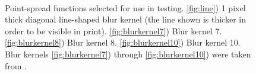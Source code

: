 \documentclass[12pt,notitlepage]{report}
\begin{document}
\begin{figure}[htb]
  \centering
	  ~
	  ~
	  ~
  \caption[Point-spread functions selected for use in testing]{Point-spread functions selected for use in testing. \ref{fig:line}) 1 pixel thick diagonal line-shaped blur kernel (the line shown is thicker in order to be visible in print). \ref{fig:blurkernel7}) Blur kernel 7. \ref{fig:blurkernel8}) Blur kernel 8. \ref{fig:blurkernel10}) Blur kernel 10. Blur kernels \ref{fig:blurkernel7}) through \ref{fig:blurkernel10}) were taken from \cite{yuan07}.}
  \label{fig:used_psfs}
\end{figure}
\end{document}
